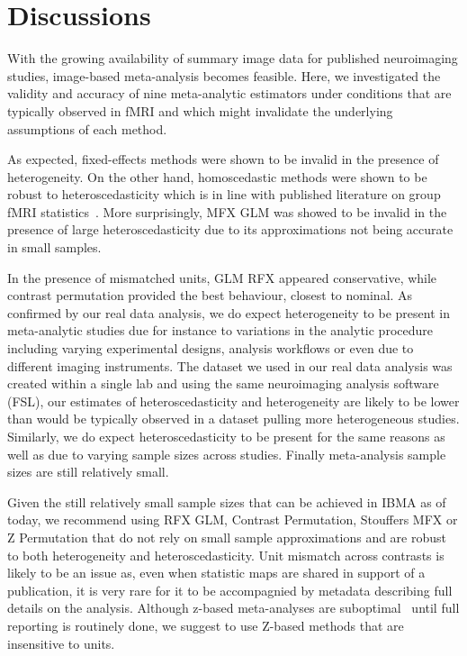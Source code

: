 \documentclass[preprint]{elsarticle}
\begin{document}
\section{Discussions}\label{sec:discussion}    
With the growing availability of summary image data for published neuroimaging studies, image-based meta-analysis becomes feasible. Here, we investigated the validity and accuracy of nine meta-analytic estimators under conditions that are typically observed in fMRI and which might invalidate the underlying assumptions of each method.

As expected, fixed-effects methods were shown to be invalid in the presence of heterogeneity. On the other hand, homoscedastic methods were shown to be robust to heteroscedasticity which is in line with published literature on group fMRI statistics~\cite{Mumford2009}. More surprisingly, MFX GLM was showed to be invalid in the presence of large heteroscedasticity due to its approximations not being accurate in small samples. 

In the presence of mismatched units, GLM RFX appeared conservative, while contrast permutation provided the best behaviour, closest to nominal. 
As confirmed by our real data analysis, we do expect heterogeneity to be present in meta-analytic studies due for instance to variations in the analytic procedure including varying experimental designs, analysis workflows or even due to different imaging instruments. The dataset we used in our real data analysis was created within a single lab and using the same neuroimaging analysis software (FSL), our estimates of heteroscedasticity and heterogeneity are likely to be lower than would be typically observed in a dataset pulling more heterogeneous studies. Similarly, we do expect heteroscedasticity to be present for the same reasons as well as due to varying sample sizes across studies. Finally meta-analysis sample sizes are still relatively small. 

Given the still relatively small sample sizes that can be achieved in IBMA as of today, we recommend using RFX GLM, Contrast Permutation, Stouffers MFX or Z Permutation that do not rely on small sample approximations and are robust to both heterogeneity and heteroscedasticity. Unit mismatch across contrasts is likely to be an issue as, even when statistic maps are shared in support of a publication, it is very rare for it to be accompagnied by metadata describing full details on the analysis. Although z-based meta-analyses are suboptimal~\cite{Cummings2004} until full reporting is routinely done, we suggest to use Z-based methods that are insensitive to units. 
\end{document}
